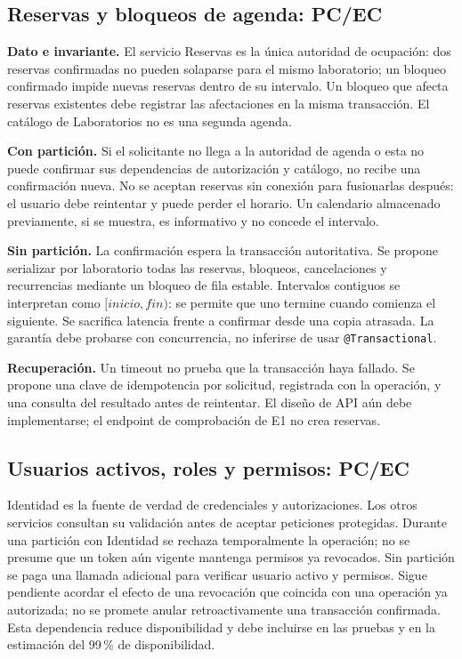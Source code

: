 \subsection{Reservas y bloqueos de agenda: PC/EC}

\textbf{Dato e invariante.} El servicio Reservas es la única autoridad de
ocupación: dos reservas confirmadas no pueden solaparse para el mismo laboratorio;
un bloqueo confirmado impide nuevas reservas dentro de su intervalo. Un bloqueo
que afecta reservas existentes debe registrar las afectaciones en la misma
transacción. El catálogo de Laboratorios no es una segunda agenda.

\textbf{Con partición.} Si el solicitante no llega a la autoridad de agenda o
esta no puede confirmar sus dependencias de autorización y catálogo, no recibe
una confirmación nueva. No se aceptan reservas sin conexión para fusionarlas
después: el usuario debe reintentar y puede perder el horario. Un calendario
almacenado previamente, si se muestra, es informativo y no concede el intervalo.

\textbf{Sin partición.} La confirmación espera la transacción autoritativa.
Se propone serializar por laboratorio todas las reservas, bloqueos, cancelaciones
y recurrencias mediante un bloqueo de fila estable. Intervalos contiguos
se interpretan como $[inicio,fin)$: se permite que uno termine cuando comienza
el siguiente. Se sacrifica latencia frente a confirmar desde una copia atrasada.
La garantía debe probarse con concurrencia, no inferirse de usar
\texttt{@Transactional}.

\textbf{Recuperación.} Un timeout no prueba que la transacción haya fallado.
Se propone una clave de idempotencia por solicitud, registrada con la operación,
y una consulta del resultado antes de reintentar. El diseño de API aún debe
implementarse; el endpoint de comprobación de E1 no crea reservas.

\subsection{Usuarios activos, roles y permisos: PC/EC}

Identidad es la fuente de verdad de credenciales y autorizaciones. Los otros
servicios consultan su validación antes de aceptar peticiones protegidas.
Durante una partición con Identidad se rechaza temporalmente la operación;
no se presume que un token aún vigente mantenga permisos ya revocados.
Sin partición se paga una llamada adicional para verificar usuario activo y
permisos. Sigue pendiente acordar el efecto de una revocación que coincida con
una operación ya autorizada; no se promete anular retroactivamente una
transacción confirmada. Esta dependencia reduce disponibilidad y debe incluirse
en las pruebas y en la estimación del 99\,\% de disponibilidad.

